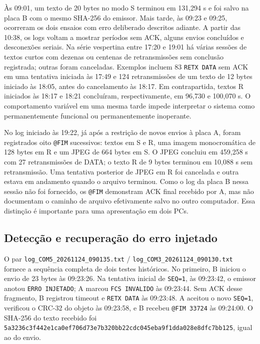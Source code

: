 \documentclass[12pt,a4paper]{article}
\begin{document}
Às 09:01, um texto de 20 bytes no modo S terminou em 131,294 s e foi salvo na placa B com o mesmo SHA-256 do emissor. Mais tarde, às 09:23 e 09:25, ocorreram os dois ensaios com erro deliberado descritos adiante. A partir das 10:38, os logs voltam a mostrar períodos sem ACK, alguns envios concluídos e desconexões seriais. Na série vespertina entre 17:20 e 19:01 há várias sessões de textos curtos com dezenas ou centenas de retransmissões sem conclusão registrada; outras foram canceladas. Exemplos incluem 83 \texttt{RETX DATA} sem ACK em uma tentativa iniciada às 17:49 e 124 retransmissões de um texto de 12 bytes iniciado às 18:05, antes do cancelamento às 18:17. Em contrapartida, textos R iniciados às 18:17 e 18:21 concluíram, respectivamente, em 96,730 e 100,070 s. O comportamento variável em uma mesma tarde impede interpretar o sistema como permanentemente funcional ou permanentemente inoperante.

No log iniciado às 19:22, já após a restrição de novos envios à placa A, foram registrados oito \texttt{@FIM} sucessivos: textos em S e R, uma imagem monocromática de 128 bytes em R e um JPEG de 664 bytes em S. O JPEG concluiu em 459,258 s com 27 retransmissões de DATA; o texto R de 9 bytes terminou em 10,088 s sem retransmissão. Uma tentativa posterior de JPEG em R foi cancelada e outra estava em andamento quando o arquivo terminou. Como o log da placa B nessa sessão não foi fornecido, os \texttt{@FIM} demonstram ACK final recebido por A, mas não documentam o caminho de arquivo efetivamente salvo no outro computador. Essa distinção é importante para uma apresentação em dois PCs.

\subsection{Detecção e recuperação do erro injetado}
\label{sec:erro_observado}
O par \texttt{log\_COM5\_20261124\_090135.txt} / \texttt{log\_COM3\_20261124\_090130.txt} fornece a sequência completa de dois testes históricos. No primeiro, B iniciou o envio de 23 bytes às 09:23:26. Na tentativa inicial de \texttt{SEQ=1}, às 09:23:42, o emissor anotou \texttt{ERRO INJETADO}; A marcou \texttt{FCS INVALIDO} às 09:23:44. Sem ACK desse fragmento, B registrou timeout e \texttt{RETX DATA} às 09:23:48. A aceitou o novo \texttt{SEQ=1}, verificou o CRC-32 do objeto às 09:23:58, e B recebeu \texttt{@FIM 33724} às 09:24:00. O SHA-256 do texto recebido foi \texttt{5a3236c3f442e1ca0ef706d73e7b320bb22cdc045eba9f1dda028e8dfc7bb125}, igual ao do envio.
\end{document}
